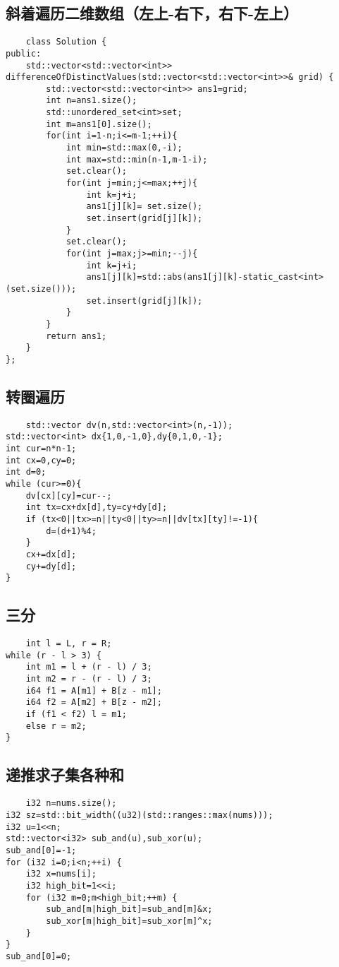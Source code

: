 \documentclass[UTF8]{ctexart}
\begin{document}
\subsection{斜着遍历二维数组（左上-右下，右下-左上）}
\begin{lstlisting}
    class Solution {
public:
    std::vector<std::vector<int>> differenceOfDistinctValues(std::vector<std::vector<int>>& grid) {
        std::vector<std::vector<int>> ans1=grid;
        int n=ans1.size();
        std::unordered_set<int>set;
        int m=ans1[0].size();
        for(int i=1-n;i<=m-1;++i){
            int min=std::max(0,-i);
            int max=std::min(n-1,m-1-i);
            set.clear();
            for(int j=min;j<=max;++j){
                int k=j+i;
                ans1[j][k]= set.size();
                set.insert(grid[j][k]);
            }
            set.clear();
            for(int j=max;j>=min;--j){
                int k=j+i;
                ans1[j][k]=std::abs(ans1[j][k]-static_cast<int>(set.size()));
                set.insert(grid[j][k]);
            }
        }
        return ans1;
    }
};
\end{lstlisting}
\subsection{转圈遍历}
\begin{lstlisting}
    std::vector dv(n,std::vector<int>(n,-1));
std::vector<int> dx{1,0,-1,0},dy{0,1,0,-1};
int cur=n*n-1;
int cx=0,cy=0;
int d=0;
while (cur>=0){
    dv[cx][cy]=cur--;
    int tx=cx+dx[d],ty=cy+dy[d];
    if (tx<0||tx>=n||ty<0||ty>=n||dv[tx][ty]!=-1){
        d=(d+1)%4;
    }
    cx+=dx[d];
    cy+=dy[d];
}
\end{lstlisting}
\subsection{三分}
\begin{lstlisting}
    int l = L, r = R;
while (r - l > 3) {
    int m1 = l + (r - l) / 3;
    int m2 = r - (r - l) / 3;
    i64 f1 = A[m1] + B[z - m1];
    i64 f2 = A[m2] + B[z - m2];
    if (f1 < f2) l = m1;
    else r = m2;
}
\end{lstlisting}
\subsection{递推求子集各种和}
\begin{lstlisting}
    i32 n=nums.size();
i32 sz=std::bit_width((u32)(std::ranges::max(nums)));
i32 u=1<<n;
std::vector<i32> sub_and(u),sub_xor(u);
sub_and[0]=-1;
for (i32 i=0;i<n;++i) {
    i32 x=nums[i];
    i32 high_bit=1<<i;
    for (i32 m=0;m<high_bit;++m) {
        sub_and[m|high_bit]=sub_and[m]&x;
        sub_xor[m|high_bit]=sub_xor[m]^x;
    }
}
sub_and[0]=0;
\end{lstlisting}
\end{document}
